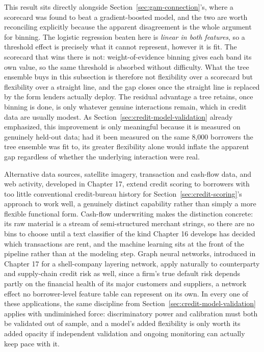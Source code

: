 \documentclass[../ai_in_finance]{subfiles}
\begin{document}
This result sits directly alongside Section~\ref{sec:gam-connection}'s, where a scorecard was found to beat a gradient-boosted model, and the two are worth reconciling explicitly because the apparent disagreement is the whole argument for binning. The logistic regression beaten here is \emph{linear in both features}, so a threshold effect is precisely what it cannot represent, however it is fit. The scorecard that wins there is not: weight-of-evidence binning gives each band its own value, so the same threshold is absorbed without difficulty. What the tree ensemble buys in this subsection is therefore not flexibility over a scorecard but flexibility over a straight line, and the gap closes once the straight line is replaced by the form lenders actually deploy. The residual advantage a tree retains, once binning is done, is only whatever genuine interactions remain, which in credit data are usually modest.
As Section~\ref{sec:credit-model-validation} already emphasized, this improvement is only meaningful because it is measured on genuinely held-out data; had it been measured on the same 8,000 borrowers the tree ensemble was fit to, its greater flexibility alone would inflate the apparent gap regardless of whether the underlying interaction were real.

Alternative data sources, satellite imagery, transaction and cash-flow data, and web activity, developed in Chapter 17, extend credit scoring to borrowers with too little conventional credit-bureau history for Section~\ref{sec:credit-scoring}'s approach to work well, a genuinely distinct capability rather than simply a more flexible functional form. Cash-flow underwriting makes the distinction concrete: its raw material is a stream of semi-structured merchant strings, so there are no bins to choose until a text classifier of the kind Chapter 16 develops has decided which transactions are rent, and the machine learning sits at the front of the pipeline rather than at the modeling step.
Graph neural networks, introduced in Chapter 17 for a shell-company layering network, apply naturally to counterparty and supply-chain credit risk as well, since a firm's true default risk depends partly on the financial health of its major customers and suppliers, a network effect no borrower-level feature table can represent on its own.
In every one of these applications, the same discipline from Section~\ref{sec:credit-model-validation} applies with undiminished force: discriminatory power and calibration must both be validated out of sample, and a model's added flexibility is only worth its added opacity if independent validation and ongoing monitoring can actually keep pace with it.
\end{document}
